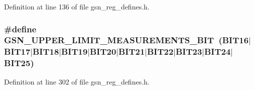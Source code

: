 Definition at line 136 of file gsn\_\-reg\_\-defines.h.

\hypertarget{a00546_a02e5833c26e7cf8f45321ed3d9886133}{
\subsubsection[{GSN\_\-UPPER\_\-LIMIT\_\-MEASUREMENTS\_\-BIT}]{\setlength{\rightskip}{0pt plus 5cm}\#define GSN\_\-UPPER\_\-LIMIT\_\-MEASUREMENTS\_\-BIT~(BIT16$|$BIT17$|$BIT18$|$BIT19$|$BIT20$|$BIT21$|$BIT22$|$BIT23$|$BIT24$|$BIT25)}}
\label{a00546_a02e5833c26e7cf8f45321ed3d9886133}


Definition at line 302 of file gsn\_\-reg\_\-defines.h.

